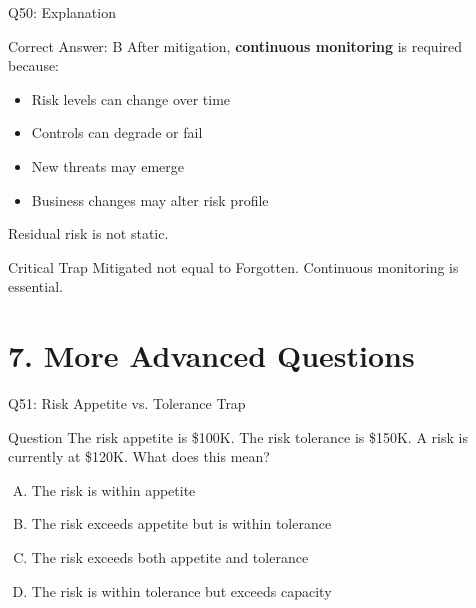 \documentclass{beamer}
\begin{document}
	\begin{frame}{Q50: Explanation}
		\begin{block}{Correct Answer: B}
			After mitigation, \textbf{continuous monitoring} is required because:
			\begin{itemize}
				\item Risk levels can change over time
				\item Controls can degrade or fail
				\item New threats may emerge
				\item Business changes may alter risk profile
			\end{itemize}
			Residual risk is not static.
		\end{block}
		\begin{alertblock}{Critical Trap}
			Mitigated not equal to Forgotten.
			Continuous monitoring is essential.
		\end{alertblock}
	\end{frame}
	
	
	\section{7. More Advanced Questions}
	
	\begin{frame}{Q51: Risk Appetite vs. Tolerance Trap}
		\begin{block}{Question}
			The risk appetite is \$100K. The risk tolerance is \$150K. A risk is currently at \$120K. What does this mean?
		\end{block}
		\begin{enumerate}[(A)]
			\item The risk is within appetite
			\item The risk exceeds appetite but is within tolerance
			\item The risk exceeds both appetite and tolerance
			\item The risk is within tolerance but exceeds capacity
		\end{enumerate}
	\end{frame}
	
\end{document}
